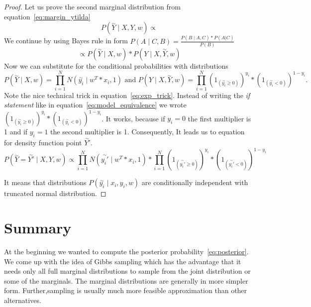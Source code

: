 \begin{proof}
Let us prove the second marginal distribution from equation~\ref{eq:margin_ytilda} 
\begin{equation}
P(\overset{\sim}{Y} \mid X, Y, w) \propto
\end{equation}
We continue by using Bayes rule in form $ P(A \mid C, B) = \frac{P( B \mid A, C) * P(A|C)}{P(B)}$ 
\begin{equation}
    \propto P(\overset{\sim}{Y} \mid X, w) * P(Y \mid X,\overset{\sim}{Y}, w)
\end{equation}
Now we can substitute for the conditional probabilities with distributions
\begin{equation}\label{eq:exp_trick}
    P(\overset{\sim}{Y} \mid X, w) = \prod_{i=1}^{N}N(\overset{\sim}{y_i} \mid w^T*x_i, 1) \text{ and } 
    P(Y \mid X,\overset{\sim}{Y}, w) = \prod_{i=1}^{N}{(1_{(\overset{\sim}{y_i} \ge 0)})}^{y_i} * {(1_{(\overset{\sim}{y_i} < 0)})}^{1-y_i}.
\end{equation}
Note the nice technical trick in equation~\ref{eq:exp_trick}. Instead of writing the {\it if statement} like in equation~\ref{eq:model_equivalence} we wrote ${(1_{(\overset{\sim}{y_i} \ge 0)})}^{y_i} * {(1_{(\overset{\sim}{y_i} < 0)})}^{1-y_i}$. It works, because if $y_i =0 $ the first multiplier is 1 and if $y_i=1$ the second multiplier is 1.
Consequently, It leads us to equation for density function point $\overset{\sim}{Y'}$.
\begin{equation}
P(\overset{\sim}{Y} = \overset{\sim}{Y'} \mid X, Y, w)
    \propto \prod_{i=1}^{N}N(\overset{\sim}{y_i'} \mid w^T*x_i, 1) * 
    \prod_{i=1}^{N}{(1_{(\overset{\sim}{y_i'} \ge 0)})}^{y_i} * {(1_{(\overset{\sim}{y_i'} < 0)})}^{1-y_i}
\end{equation}

It means that distributions $ P(\overset{\sim}{y_i} \mid  x_i, y_i, w) $ are conditionally independent with truncated normal distribution.
\end{proof}


\section{Summary} 
\label{sec:summary}
At the beginning we wanted to compute the posterior probability~\ref{eq:posterior}. We come up with the idea of Gibbs sampling which has the advantage that it needs only all full marginal distributions to sample from the joint distribution or some of the marginals. The marginal distributions are generally in more simpler form. Further,sampling is usually much more feasible approximation than other alternatives. 

